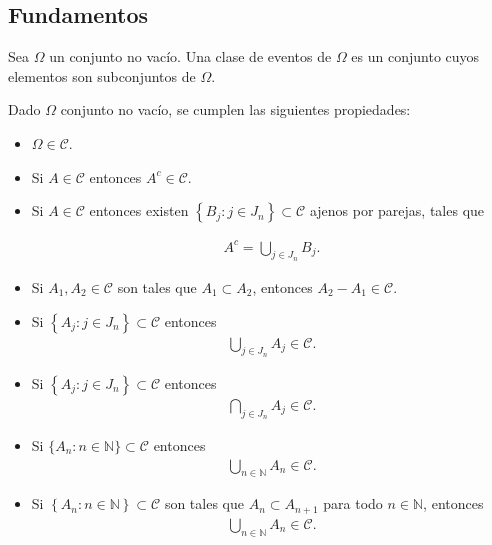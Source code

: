 \subsection{Fundamentos}


Sea $\Omega$ un conjunto no vac\'io. Una clase de eventos de $\Omega$ es un conjunto cuyos elementos son subconjuntos de $\Omega$. 

\begin{Propty} Dado  $\Omega$ conjunto no vac\'io, se cumplen las siguientes propiedades: 

\begin{itemize}
\item[(i)] $\Omega \in \mathcal{C}$.

\item[(ii)] Si $A \in \mathcal{C}$ entonces $A^{c} \in \mathcal{C}$.

\item[(iii)] Si $A \in \mathcal{C}$ entonces existen $\left\{B_j : j \in J_n\right\} \subset \mathcal{C}$ ajenos por parejas, tales que

\begin{eqnarray*}
A^{c} = \bigcup_{j \in J_n} B_j.
\end{eqnarray*}

\item[(iv)] Si $A_1, A_2 \in \mathcal{C}$ son tales que $A_1 \subset A_2$, entonces $A_{2} - A_{1} \in \mathcal{C}$.

\item[(v)] Si $\left\{A_{j} : j \in J_n\right\} \subset \mathcal{C}$ entonces
\begin{eqnarray*}
\bigcup_{j \in J_n} A_j \in \mathcal{C}.
\end{eqnarray*}

\item[(vi)] Si $\left\{A_{j} : j \in J_{n}\right\} \subset \mathcal{C}$ entonces
\begin{eqnarray*}
\bigcap_{j \in J_{n}} A_j \in \mathcal{C}.
\end{eqnarray*}

\item[(vii)] Si $\{A_n : n \in \mathbb{N}\} \subset \mathcal{C}$ entonces
\begin{eqnarray*}
\bigcup_{n \in \mathbb{N}} A_n \in \mathcal{C}.
\end{eqnarray*}

\item[(viii)] Si $\left\{A_n : n \in \mathbb{N}\right\} \subset \mathcal{C}$ son tales que
$A_n \subset A_{n+1}$ para todo $n \in \mathbb{N}$, entonces
\begin{eqnarray*}
\bigcup_{n \in \mathbb{N}} A_n \in \mathcal{C}.
\end{eqnarray*}


\end{itemize}
\end{Propty}
